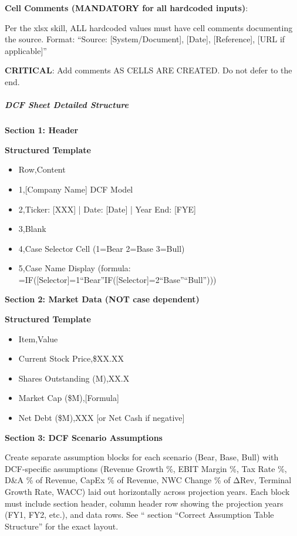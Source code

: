 \documentclass[11pt]{article}
\begin{document}
\textbf{Cell Comments (MANDATORY for all hardcoded inputs)}:


Per the xlsx skill, ALL hardcoded values must have cell comments documenting the source. Format: ``Source: [System/Document], [Date], [Reference], [URL if applicable]''


\textbf{CRITICAL}: Add comments AS CELLS ARE CREATED. Do not defer to the end.


\subparagraph{DCF Sheet Detailed Structure}\mbox{}\par

\textbf{Section 1: Header}

\textbf{Structured Template}
\begin{itemize}[leftmargin=*,itemsep=2pt,topsep=2pt]
\item {} Row,Content
\item {} 1,[Company Name] DCF Model
\item {} 2,Ticker: [XXX] | Date: [Date] | Year End: [FYE]
\item {} 3,Blank
\item {} 4,Case Selector Cell (1=Bear 2=Base 3=Bull)
\item {} 5,Case Name Display (formula: =IF([Selector]=1``Bear''IF([Selector]=2``Base''``Bull'')))
\end{itemize}

\textbf{Section 2: Market Data (NOT case dependent)}

\textbf{Structured Template}
\begin{itemize}[leftmargin=*,itemsep=2pt,topsep=2pt]
\item {} Item,Value
\item {} Current Stock Price,\$XX.XX
\item {} Shares Outstanding (M),XX.X
\item {} Market Cap (\$M),[Formula]
\item {} Net Debt (\$M),XXX [or Net Cash if negative]
\end{itemize}

\textbf{Section 3: DCF Scenario Assumptions}


Create separate assumption blocks for each scenario (Bear, Base, Bull) with DCF-specific assumptions (Revenue Growth \%, EBIT Margin \%, Tax Rate \%, D\&A \% of Revenue, CapEx \% of Revenue, NWC Change \% of ΔRev, Terminal Growth Rate, WACC) laid out horizontally across projection years. Each block must include section header, column header row showing the projection years (FY1, FY2, etc.), and data rows. See `` section ``Correct Assumption Table Structure'' for the exact layout.
\end{document}
